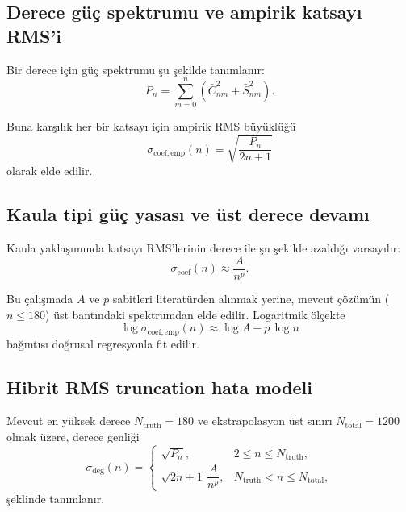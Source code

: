 \subsection{Derece güç spektrumu ve ampirik katsayı RMS’i}
Bir derece için güç spektrumu şu şekilde tanımlanır:
\begin{equation}
P_n
=
\sum_{m=0}^{n}
\left(\bar{C}_{nm}^2+\bar{S}_{nm}^2\right).
\label{eq:power_spectrum}
\end{equation}

Buna karşılık her bir katsayı için ampirik RMS büyüklüğü
\begin{equation}
\sigma_{\mathrm{coef,emp}}(n)
=
\sqrt{\frac{P_n}{2n+1}}
\label{eq:sigma_emp}
\end{equation}
olarak elde edilir.

\subsection{Kaula tipi güç yasası ve üst derece devamı}
Kaula yaklaşımında katsayı RMS’lerinin derece ile şu şekilde azaldığı varsayılır:
\begin{equation}
\sigma_{\mathrm{coef}}(n)
\approx
\frac{A}{n^{p}}.
\label{eq:kaula_law}
\end{equation}

Bu çalışmada $A$ ve $p$ sabitleri literatürden alınmak yerine, mevcut çözümün ($n \le 180$) üst bantındaki spektrumdan elde edilir. Logaritmik ölçekte
\begin{equation}
\log \sigma_{\mathrm{coef,emp}}(n)
\approx
\log A - p\,\log n
\label{eq:loglog_fit}
\end{equation}
bağıntısı doğrusal regresyonla fit edilir.

\subsection{Hibrit RMS truncation hata modeli}
Mevcut en yüksek derece $N_{\mathrm{truth}}=180$ ve ekstrapolasyon üst sınırı $N_{\mathrm{total}}=1200$ olmak üzere, derece genliği
\begin{equation}
\sigma_{\mathrm{deg}}(n)
=
\begin{cases}
\sqrt{P_n}, & 2\le n \le N_{\mathrm{truth}},\\[6pt]
\sqrt{2n+1}\,\dfrac{A}{n^{p}}, & N_{\mathrm{truth}}< n \le N_{\mathrm{total}},
\end{cases}
\label{eq:sigma_deg_hybrid}
\end{equation}
şeklinde tanımlanır.

